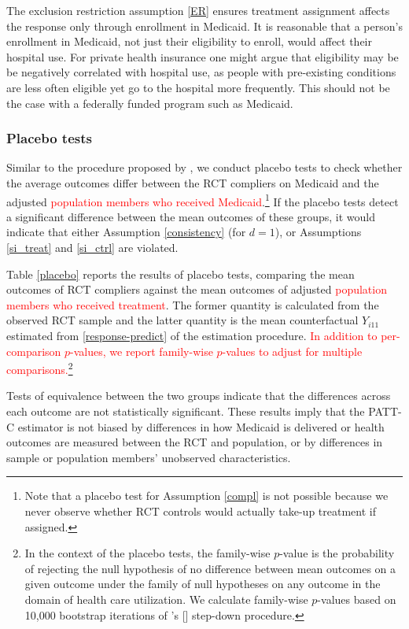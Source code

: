 \documentclass[hidelinks,12pt]{article}
\newcommand{\possessivecite}[1]{\citeauthor{#1}'s [\citeyear{#1}]}
\begin{document}
The exclusion restriction assumption \eqref{ER} ensures treatment assignment affects the response only through enrollment in Medicaid. It is reasonable that a person's enrollment in Medicaid, not just their eligibility to enroll, would affect their hospital use. For private health insurance one might argue that eligibility may be be negatively correlated with hospital use, as people with pre-existing conditions are less often eligible yet go to the hospital more frequently. This should not be the case with a federally funded program such as Medicaid. 

\subsubsection{Placebo tests} \label{placebo-tests}

Similar to the procedure proposed by \citep{Hartman}, we conduct placebo tests to check whether the average outcomes differ between the RCT compliers on Medicaid and the adjusted \textcolor{red}{population members who received Medicaid}.\footnote{Note that a placebo test for Assumption \eqref{compl} is not possible because we never observe whether RCT controls would actually take-up treatment if assigned.} If the placebo tests detect a significant difference between the mean outcomes of these groups, it would indicate that either Assumption \eqref{consistency} (for $d=1$), or Assumptions \eqref{si_treat} and \eqref{si_ctrl} are violated. 

Table \ref{placebo} reports the results of placebo tests, comparing the mean outcomes of RCT compliers against the mean outcomes of adjusted \textcolor{red}{population members who received treatment}. The former quantity is calculated from the observed RCT sample and the latter quantity is the mean counterfactual $Y_{i11}$ estimated from \ref{response-predict} of the estimation procedure. \textcolor{red}{In addition to per-comparison $p$-values, we report family-wise $p$-values to adjust for multiple comparisons.\footnote{In the context of the placebo tests, the family-wise $p$-value is the probability of rejecting the null hypothesis of no difference between mean outcomes on a given outcome under the family of null hypotheses on any outcome in the domain of health care utilization. We calculate family-wise $p$-values based on 10,000 bootstrap iterations of \possessivecite{westfall1993resampling} step-down procedure.}}

Tests of equivalence between the two groups indicate that the differences across each outcome are not statistically significant. These results imply that the PATT-C estimator is not biased by differences in how Medicaid is delivered or health outcomes are measured between the RCT and population, or by differences in sample or population members' unobserved characteristics. 
\end{document}
